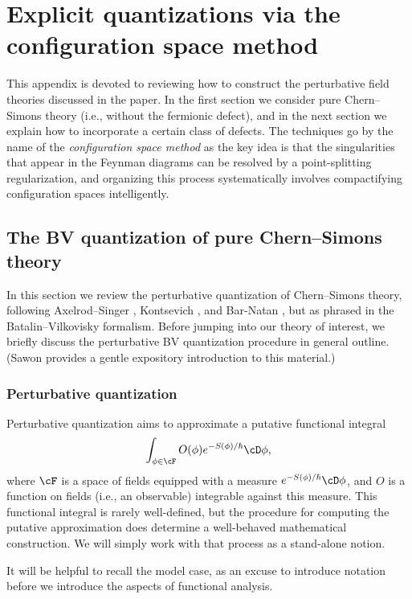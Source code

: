 \documentclass[10pt]{amsart}
\begin{document}
\appendix
\section{Explicit quantizations via the configuration space method}

This appendix is devoted to reviewing how to construct the perturbative field theories discussed in the paper.
In the first section we consider pure Chern--Simons theory (i.e., without the fermionic defect),
and in the next section we explain how to incorporate a certain class of defects.
The techniques go by the name of the {\it configuration space method} as the key idea is that the singularities that appear in the Feynman diagrams can be resolved by a point-splitting regularization,
and organizing this process systematically involves compactifying configuration spaces intelligently.

\subsection{The BV quantization of pure Chern--Simons theory}
\label{pure CS quantization}

In this section we review the perturbative quantization of Chern--Simons theory,
following Axelrod--Singer \cite{AxeSinI,AxeSinII}, Kontsevich \cite{KonECM}, and Bar-Natan \cite{BarCS},
but as phrased in the Batalin--Vilkovisky formalism.
Before jumping into our theory of interest,
we briefly discuss the perturbative BV quantization procedure in general outline.
(Sawon \cite{SawCS} provides a gentle expository introduction to this material.)

\subsubsection{Perturbative quantization}

Perturbative quantization aims to approximate a putative functional integral
\[
\int_{\phi \in \cF} O(\phi) e^{-S(\phi)/\hbar} \cD \phi,
\]
where $\cF$ is a space of fields equipped with a measure $e^{-S(\phi)/\hbar} \cD \phi$,
and $O$ is a function on fields (i.e., an observable) integrable against this measure.
This functional integral is rarely well-defined, 
but the procedure for computing the putative approximation does determine a well-behaved mathematical construction.
We will simply work with that process as a stand-alone notion.

It will be helpful to recall the model case, 
as an excuse to introduce notation before we introduce the aspects of functional analysis.
\end{document}
